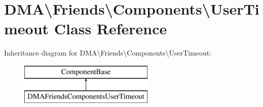 \hypertarget{classDMA_1_1Friends_1_1Components_1_1UserTimeout}{}\section{D\+M\+A\textbackslash{}Friends\textbackslash{}Components\textbackslash{}User\+Timeout Class Reference}
\label{classDMA_1_1Friends_1_1Components_1_1UserTimeout}
Inheritance diagram for D\+M\+A\textbackslash{}Friends\textbackslash{}Components\textbackslash{}User\+Timeout\+:\begin{figure}[H]
\begin{center}
\leavevmode
\includegraphics[height=2.000000cm]{d7/d5c/classDMA_1_1Friends_1_1Components_1_1UserTimeout}
\end{center}
\end{figure}
